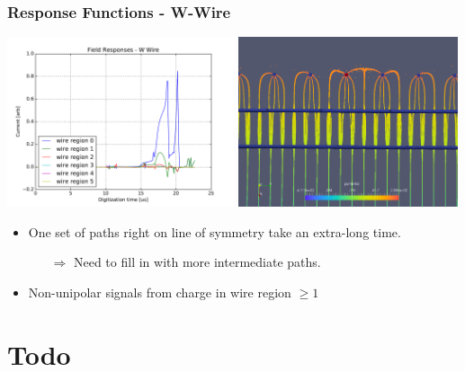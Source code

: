\documentclass[xcolor=dvipsnames]{beamer}
\begin{document}
\begin{frame}
  \frametitle{Response Functions - W-Wire}
  \begin{center}
    \includegraphics[height=5cm,clip,trim=0 0cm 0cm 0cm]{steps/wcurrent-responses.pdf}%
    \includegraphics[height=5cm,clip,trim=0 0cm 0cm 0cm]{steps/wpaths-1.png}
  \end{center}
  \footnotesize 
  \begin{itemize}
  \item One set of paths right on line of symmetry take an extra-long time.
    \begin{itemize}\scriptsize
    \item[$\Rightarrow$] Need to fill in with more intermediate paths.
    \end{itemize}
  \item Non-unipolar signals from charge in wire region $\ge1$
  \end{itemize}
\end{frame}

\section{Todo}
\end{document}
